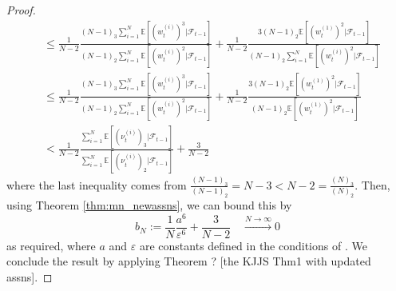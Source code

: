 \documentclass[fleqn]{article}
\theoremstyle{definition}
\newcommand{\E}{\mathbb{E}}
\newcommand{\Ntoinfty}{\overset{N\to\infty}{\longrightarrow}}
\newcommand{\F}{\mathcal{F}_{t-1}}
\newcommand{\vt}[2][t]{\nu_{#1}^{(#2)}}
\newcommand{\wt}[2][t]{w_{#1}^{(#2)}}
\begin{document}
\begin{proof}
\begin{align*}
&\leq \frac{1}{N-2} \frac{(N-1)_3 \sum_{i=1}^{N} \E[(\wt{i})^3 |\F]}{(N-1)_2 \sum_{i=1}^{N} \E[(\wt{i})^2 |\F]} + \frac{1}{N-2} \frac{3(N-1)_2 \E[(\wt{1})^2 |\F]}{(N-1)_2 \sum_{i=1}^{N} \E[(\wt{i})^2 |\F]} \\
&\leq \frac{1}{N-2} \frac{(N-1)_3 \sum_{i=1}^{N} \E[(\wt{i})^3 |\F]}{(N-1)_2 \sum_{i=1}^{N} \E[(\wt{i})^2 |\F]} + \frac{1}{N-2} \frac{3(N-1)_2 \E[(\wt{1})^2 |\F]}{(N-1)_2 \E[(\wt{1})^2 |\F]} \\
&<  \frac{1}{N-2} \frac{\sum_{i=1}^{N} \E[(\vt{i})_3 |\F]}{\sum_{i=1}^{N} \E[(\vt{i})_2 |\F]} + \frac{3}{N-2}
\end{align*}
where the last inequality comes from $\frac{(N-1)_3}{(N-1)_2} = N-3 < N-2 = \frac{(N)_3}{(N)_2}$.
Then, using Theorem \ref{thm:mn_newassns}, we can bound this by
\begin{equation*}
b_N := \frac{1}{N}\frac{a^6}{\varepsilon^6} + \frac{3}{N-2} \quad \Ntoinfty 0
\end{equation*}
as required, where $a$ and $\varepsilon$ are constants defined in the conditions of \citet[Lemma 3]{koskela2018}.
We conclude the result by applying Theorem ? [the KJJS Thm1 with updated assns].
\end{proof}


\end{document}

